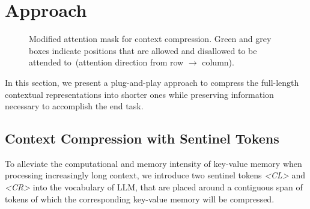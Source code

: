 \section{Approach}
\label{sec:kv}
\begin{figure}[t]
	\centering
  \caption{Modified attention mask for context compression. Green and grey boxes indicate positions that are allowed and disallowed to be attended to~(attention direction from row $\rightarrow$ column).}
	\label{fig:kv}
\end{figure}

In this section, we present a plug-and-play approach to compress the full-length contextual representations into shorter ones while preserving information necessary to accomplish the end task.

\subsection{Context Compression with Sentinel Tokens}
To alleviate the computational and memory intensity of key-value memory when processing increasingly long context, we introduce two sentinel tokens \textit{<CL>} and \textit{<CR>} into the vocabulary of LLM, that are placed around a contiguous span of tokens of which the corresponding key-value memory will be compressed. 

